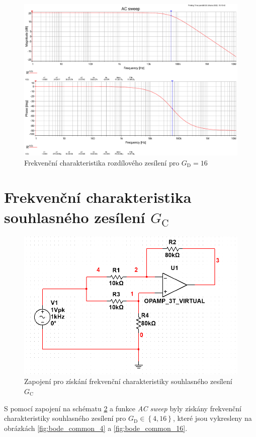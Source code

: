 \documentclass[twoside]{article}
\begin{document}
\begin{figure}[h!]
    \centering
    \includegraphics[width=0.92\linewidth]{bode_diff_16.pdf}
    \caption{Frekvenční charakteristika rozdílového zesílení pro $G_\text{D} = 16$}
    \label{fig:bode_diff_16}
\end{figure}

\newpage
\section{Frekvenční charakteristika souhlasného zesílení $G_\text{C}$}

\begin{figure}[h!]
    \centering
    \includegraphics[width=0.8\linewidth]{rozdilovy_common_mode.png}
    \caption{Zapojení pro získání frekvenční charakteristiky souhlasného zesílení $G_\text{C}$}
    \label{fig:schema_common}
\end{figure}


S pomocí zapojení na schématu \ref{fig:schema_common} a funkce \textit{AC sweep} byly
získány frekvenční charakteristiky souhlasného zesílení pro $G_\text{D} \in \left\{4, 16\right\}$,
které jsou vykresleny na obrázkách \ref{fig:bode_common_4} a \ref{fig:bode_common_16}.
\end{document}
